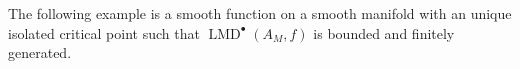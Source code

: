 \documentclass[a4paper,dvipdfmx,reqno,12pt]{amsart}
\theoremstyle{definition}
\newtheorem{definition}[theorem]{Definition}
\newcommand{\mcal}[1]{\mathcal{#1}}%
\newcommand{\opn}[1]{\operatorname{#1}}
\numberwithin{equation}{section}
\begin{document}





The following example is a smooth function on a 
smooth manifold with an unique isolated critical point such
that $\opn{LMD}^{\bullet}(A_M,f)$ is bounded and 
finitely generated.
\end{document}
